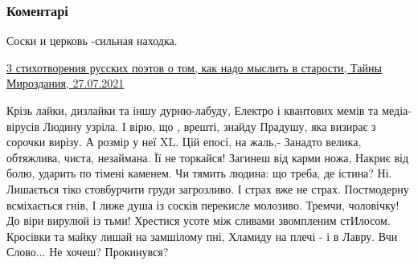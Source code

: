  
 
 
 
 
\subsubsection{Коментарі}

\begin{itemize}
 
Соски и церковь -сильная находка.

 

\href{http://www.tayni-mirozdaniya.ru/2021/07/3_23.html}{%
3 стихотворения русских поэтов о том, как надо мыслить в старости, Тайны Мироздания, 27.07.2021%
}

 

\obeycr
Крізь лайки, дизлайки та іншу дурню-лабуду,
Електро і квантових мемів та медіа-вірусів
Людину узріла. І вірю, що , врешті, знайду
Прадушу, яка визирає з сорочки вирізу.
\smallskip
А розмір у неї XL. Цій епосі, на жаль,-
Занадто велика, обтяжлива, чиста, незаймана.
Її не торкайся! Загинеш від карми ножа,
Накриє від болю, ударить по тімені каменем.
\smallskip
Чи тямить людина: що треба, де істина? Ні.
Лишається тіко стовбурчити груди загрозливо.
І страх вже не страх. Постмодерну всміхається гнів,
І лиже душа із сосків перекисле молозиво.
\smallskip
Тремчи, чоловічку! До віри вирулюй із тьми!
Хрестися усоте між сливами звомпленим стИлосом.
Кросівки та майку лишай на замшілому пні,
Хламиду на плечі - і в Лавру. Вчи Слово... 
\smallskip
Не хочеш? Прокинувся?
\restorecr


\end{itemize}
